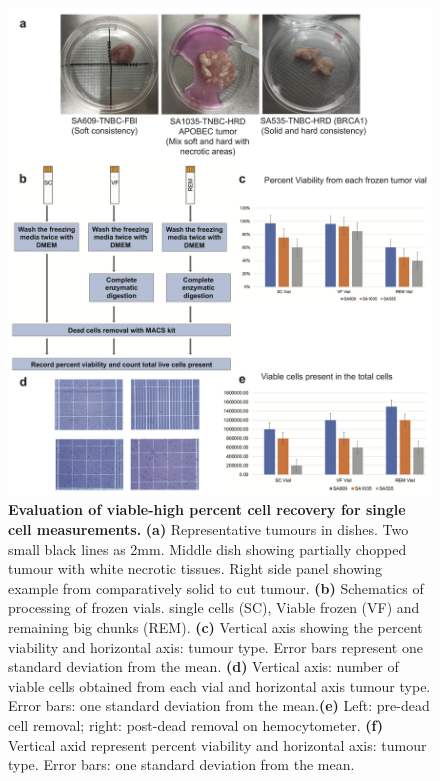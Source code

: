 \begin{figure}
	\centering
	\includegraphics[width=\textwidth]{Figures/chap3/cellviability2.png}
	\caption[Evaluation of viable-high percent cell recovery for single cell measurements]
	{\small
	    \textbf{Evaluation of viable-high percent cell recovery for single cell measurements.}
	    \textbf{(a)} Representative tumours in dishes. Two small black lines as 2mm. Middle dish showing partially chopped tumour with white necrotic tissues. Right side panel showing example from comparatively solid to cut tumour.
	    \textbf{(b)} Schematics of processing of frozen vials. single cells (SC), Viable frozen (VF) and remaining big chunks (REM).
	    \textbf{(c)} Vertical axis showing the percent viability and horizontal axis: tumour type. Error bars represent one standard deviation from the mean. \textbf{(d)} Vertical axis: number of viable cells obtained from each vial and horizontal axis tumour type. Error bars: one standard deviation from the mean.\textbf{(e)} Left: pre-dead cell removal; right: post-dead removal on hemocytometer. \textbf{(f)} Vertical axid represent percent viability and   horizontal axis: tumour type. Error bars: one standard deviation from the mean.  
	}
	\label{fig:cellviability}
\end{figure}


